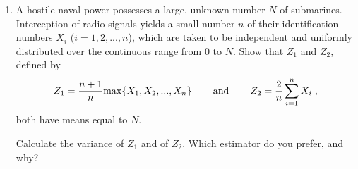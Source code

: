 \documentclass[a4, 11pt]{report}
\newlength{\qspace}
\newcounter{qnumber}
\newenvironment{question}%
 {\vspace{\qspace}
  \begin{enumerate}[\bfseries 1\quad][10]%
    \setcounter{enumi}{\value{qnumber}}%
    \item%
 }
{
  \end{enumerate}
  \filbreak
  \stepcounter{qnumber}
 }
\begin{document}
\begin{question}
A hostile naval power possesses a large, unknown number $N$ of 
submarines. Interception of radio signals yields a small number $n$ 
of their identification numbers $X_i$ ($i=1,2,...,n$), which are taken
to be independent and uniformly distributed over the continuous range
from $0$ to $N$. Show that $Z_1$ and $Z_2$, defined by
$$
Z_1 = {n+1\over n} {\max}\{X_1,X_2,...,X_n\} 
\hspace{0.3in} {\rm and} \hspace{0.3in}
Z_2 = {2\over n} \sum_{i=1}^n X_i \;,
$$
both have means equal to $N$.

Calculate the variance of $Z_1$ and of $Z_2$. Which estimator
do you prefer, and why?
\end{question}
	
\end{document}
